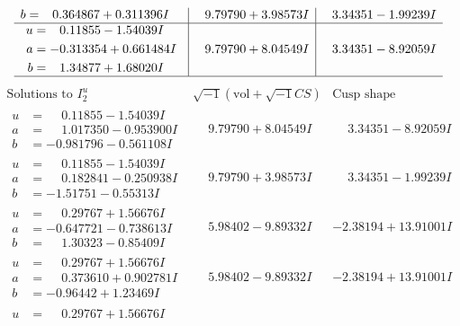 \documentclass[1p]{elsarticle_modified}
\theoremstyle{definition}
\newcommand{\I}{\sqrt{-1}}
\begin{document}
$$\begin{array}{c|c|c}
\begin{aligned}
b &= \phantom{-}0.364867 + 0.311396 I\end{aligned}
 & \phantom{-}9.79790 + 3.98573 I & \phantom{-}3.34351 - 1.99239 I \\ \hline\begin{aligned}
u &= \phantom{-}0.11855 - 1.54039 I \\
a &= -0.313354 + 0.661484 I \\
b &= \phantom{-}1.34877 + 1.68020 I\end{aligned}
 & \phantom{-}9.79790 + 8.04549 I & \phantom{-}3.34351 - 8.92059 I\\
 \hline 
 \end{array}$$\newpage$$\begin{array}{c|c|c}  
\text{Solutions to }I^u_{2}& \I (\text{vol} + \sqrt{-1}CS) & \text{Cusp shape}\\
 \hline 
\begin{aligned}
u &= \phantom{-}0.11855 - 1.54039 I \\
a &= \phantom{-}1.017350 - 0.953900 I \\
b &= -0.981796 - 0.561108 I\end{aligned}
 & \phantom{-}9.79790 + 8.04549 I & \phantom{-}3.34351 - 8.92059 I \\ \hline\begin{aligned}
u &= \phantom{-}0.11855 - 1.54039 I \\
a &= \phantom{-}0.182841 - 0.250938 I \\
b &= -1.51751 - 0.55313 I\end{aligned}
 & \phantom{-}9.79790 + 3.98573 I & \phantom{-}3.34351 - 1.99239 I \\ \hline\begin{aligned}
u &= \phantom{-}0.29767 + 1.56676 I \\
a &= -0.647721 - 0.738613 I \\
b &= \phantom{-}1.30323 - 0.85409 I\end{aligned}
 & \phantom{-}5.98402 - 9.89332 I & -2.38194 + 13.91001 I \\ \hline\begin{aligned}
u &= \phantom{-}0.29767 + 1.56676 I \\
a &= \phantom{-}0.373610 + 0.902781 I \\
b &= -0.96442 + 1.23469 I\end{aligned}
 & \phantom{-}5.98402 - 9.89332 I & -2.38194 + 13.91001 I \\ \hline\begin{aligned}
u &= \phantom{-}0.29767 + 1.56676 I \\

\end{aligned}
\end{array}$$
\end{document}
